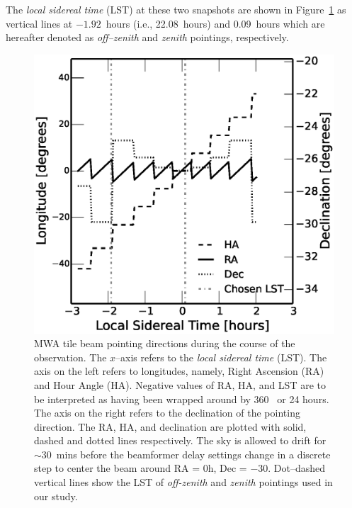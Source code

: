 \documentclass[preprint2,iop,numberedappendix]{emulateapj}
\begin{document}
The {\it local sidereal time} (LST) at these two snapshots are shown in Figure~\ref{fig:pointings} as vertical lines at $-1.92$~hours (i.e., 22.08~hours) and 0.09~hours which are hereafter denoted as {\it off--zenith} and {\it zenith} pointings, respectively. %

\begin{figure}[htb]
\centering
\includegraphics[width=\linewidth]{figures/v1_0/custom_pointings.eps}
\caption{MWA tile beam pointing directions during the course of the observation. The $x$--axis refers to the {\it local sidereal time} (LST). The axis on the left refers to longitudes, namely, Right Ascension (RA) and Hour Angle (HA). Negative values of RA, HA, and LST are to be interpreted as having been wrapped around by 360\arcdeg~ or 24 hours. The axis on the right refers to the declination of the pointing direction. The RA, HA, and declination are plotted with solid, dashed and dotted lines respectively. The sky is allowed to drift for $\sim 30$~mins before the beamformer delay settings change in a discrete step to center the beam around RA = 0h, Dec = $-30$\arcdeg. Dot--dashed vertical lines show the LST of {\it off-zenith} and {\it zenith} pointings used in our study. \label{fig:pointings}}
\end{figure}
\end{document}
